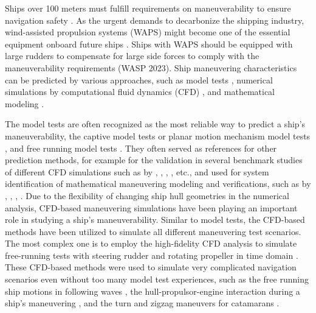 Ships over 100 meters must fulfill requirements on maneuverability to ensure navigation safety \citep{imoStandardsShipManoeuvrability2002}. As the urgent demands to decarbonize the shipping industry, wind-assisted propulsion systems (WAPS) might become one of the essential equipment onboard future ships \citep{nelissenStudyAnalysisMarket2016}. Ships with WAPS should be equipped with large rudders to compensate for large side forces to comply with the maneuverability requirements (WASP 2023). Ship maneuvering characteristics can be predicted by various approaches, such as model tests \citep{ittcManeuveringCommitteeITTC2008}, numerical simulations by computational fluid dynamics (CFD) \citep{elmoctarRANSBasedSimulatedShip2014,dumanTurnZigzagManoeuvres2022}, and mathematical modeling \citep{abkowitzMEASUREMENTHYDRODYNAMICCHARACTERISTICS1980,fossenHandbookMarineCraft2011,yasukawaIntroductionMMGStandard2015,alexanderssonSystemIdentificationPhysicsinformed2024b}. 

The model tests are often recognized as the most reliable way to predict a ship’s maneuverability, the captive model tests or planar motion mechanism model tests \citep{ittcITTCRecommendedProcedures2008}, and free running model tests \citep{FinalReportRecommendations2021}. They often served as references for other prediction methods, for example for the validation in several benchmark studies of different CFD simulations such as by \citet{sternExperienceSIMMAN20082011}, \citet{sakamotoURANSSimulationsStatic2012}, \citet{yoonBenchmarkCFDValidation2015a}, \citet{yasukawaValidation6DOFMotion2021}, etc., and used for system identification of mathematical maneuvering modeling and verifications, such as by \citet{luoParameterIdentificationShip2016}, \citet{xuUncertaintyAnalysisHydrodynamic2019}, \citet{wangOptimalDesignExcitation2020}, \citet{alexanderssonSystemIdentificationVessel2022}. Due to the flexibility of changing ship hull geometries in the numerical analysis, CFD-based maneuvering simulations have been playing an important role in studying a ship’s maneuverability. Similar to model tests, the CFD-based methods have been utilized to simulate all different maneuvering test scenarios. The most complex one is to employ the high-fidelity CFD analysis to simulate free-running tests with steering rudder and rotating propeller in time domain \citep{dubbiosoTurningAbilityAnalysis2016a, islamEstimationHydrodynamicDerivatives2018}. These CFD-based methods were used to simulate very complicated navigation scenarios even without too many model test experiences, such as the free running ship motions in following waves \citep{arakiImprovedManeuveringBasedMathematical2019}, the hull-propulsor-engine interaction during a ship’s maneuvering \citep{elmoctarRANSBasedSimulatedShip2014}, and the turn and zigzag maneuvers for catamarans \citep{dumanTurnZigzagManoeuvres2022}.

